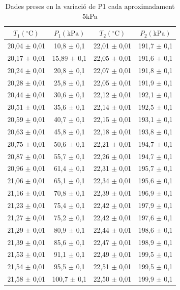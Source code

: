 \documentclass[12pt,twosides,onecolumn,openany]{article}
\begin{document}
\begin{table}[h]
    \centering
    \caption{Dades preses en la variació de P1 cada aproximadament 5kPa}
    \label{tab:presstemp}
    \begin{tabular}{c|c|c|c}

        $T_1(^\circ \text{C})$ & $P_1(\text{kPa})$ & $T_2(^\circ \text{C})$ & $P_2(\text{kPa})$ \\
        \hline\hline
        20,04 $\pm$ 0,01 & 10,8 $\pm$ 0,1 & 22,01 $\pm$ 0,01 & 191,7 $\pm$ 0,1 \\
        20,17 $\pm$ 0,01 & 15,89 $\pm$ 0,1 & 22,05 $\pm$ 0,01 & 191,6 $\pm$ 0,1 \\
        20,24 $\pm$ 0,01 & 20,8 $\pm$ 0,1 & 22,07 $\pm$ 0,01 & 191,8 $\pm$ 0,1 \\
        20,28 $\pm$ 0,01 & 25,8 $\pm$ 0,1 & 22,05 $\pm$ 0,01 & 191,9 $\pm$ 0,1 \\
        20,44 $\pm$ 0,01 & 30,6 $\pm$ 0,1 & 22,12 $\pm$ 0,01 & 192,1 $\pm$ 0,1 \\
        20,51 $\pm$ 0,01 & 35,6 $\pm$ 0,1 & 22,14 $\pm$ 0,01 & 192,5 $\pm$ 0,1 \\
        20,59 $\pm$ 0,01 & 40,7 $\pm$ 0,1 & 22,15 $\pm$ 0,01 & 193,1 $\pm$ 0,1 \\
        20,63 $\pm$ 0,01 & 45,8 $\pm$ 0,1 & 22,18 $\pm$ 0,01 & 193,8 $\pm$ 0,1 \\
        20,75 $\pm$ 0,01 & 50,6 $\pm$ 0,1 & 22,21 $\pm$ 0,01 & 194,7 $\pm$ 0,1 \\
        20,87 $\pm$ 0,01 & 55,7 $\pm$ 0,1 & 22,26 $\pm$ 0,01 & 194,7 $\pm$ 0,1 \\
        20,96 $\pm$ 0,01 & 61,4 $\pm$ 0,1 & 22,31 $\pm$ 0,01 & 195,7 $\pm$ 0,1 \\
        21,06 $\pm$ 0,01 & 65,1 $\pm$ 0,1 & 22,34 $\pm$ 0,01 & 195,6 $\pm$ 0,1 \\
        21,16 $\pm$ 0,01 & 70,8 $\pm$ 0,1 & 22,39 $\pm$ 0,01 & 196,9 $\pm$ 0,1 \\
        21,23 $\pm$ 0,01 & 75,4 $\pm$ 0,1 & 22,42 $\pm$ 0,01 & 197,9 $\pm$ 0,1 \\
        21,27 $\pm$ 0,01 & 75,2 $\pm$ 0,1 & 22,42 $\pm$ 0,01 & 197,6 $\pm$ 0,1 \\
        21,29 $\pm$ 0,01 & 80,9 $\pm$ 0,1 & 22,44 $\pm$ 0,01 & 198,6 $\pm$ 0,1 \\
        21,39 $\pm$ 0,01 & 85,6 $\pm$ 0,1 & 22,47 $\pm$ 0,01 & 198,9 $\pm$ 0,1 \\
        21,53 $\pm$ 0,01 & 91,1 $\pm$ 0,1 & 22,49 $\pm$ 0,01 & 199,5 $\pm$ 0,1 \\
        21,54 $\pm$ 0,01 & 95,5 $\pm$ 0,1 & 22,51 $\pm$ 0,01 & 199,5 $\pm$ 0,1 \\
        21,58 $\pm$ 0,01 & 100,7 $\pm$ 0,1 & 22,50 $\pm$ 0,01 & 199,9 $\pm$ 0,1 \\

    \end{tabular}
\end{table}
\end{document}

